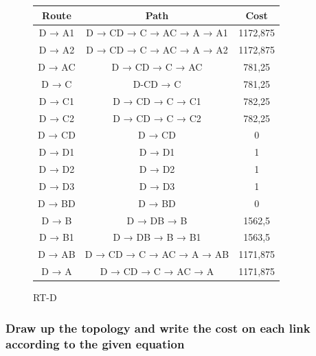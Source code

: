 \documentclass[a4paper, titlepage,12pt]{article}
\begin{document}
		\begin{figure}
			\begin{center}
				\begin{tabular}{|c|c|c|}
					\hline
	Route & Path & Cost \\
	\hline
	D → A1 & D → CD → C → AC → A → A1 & 1172,875 \\
	\hline
	D → A2 & D → CD → C → AC → A → A2 & 1172,875 \\
	\hline
	D → AC & D → CD → C → AC & 781,25 \\
	\hline
	D → C & D-CD → C & 781,25 \\
	\hline
	D → C1 & D → CD → C → C1 & 782,25 \\
	\hline
	D → C2 & D → CD → C → C2 & 782,25 \\
	\hline
	D → CD & D → CD & 0 \\
	\hline
	D → D1 & D → D1 & 1 \\
	\hline
	D → D2 & D → D2 & 1 \\
	\hline
	D → D3 & D → D3 & 1 \\
	\hline
	D → BD & D → BD & 0 \\
	\hline
	D → B & D → DB → B & 1562,5 \\
	\hline
	D → B1 & D → DB → B → B1 & 1563,5 \\
	\hline
	D → AB & D → CD → C → AC → A → AB & 1171,875 \\
	\hline
	D → A & D → CD → C → AC → A & 1171,875 \\
	\hline
				\end{tabular}
				\caption{RT-D}
			\end{center}
		\end{figure}

		\subsubsection{Draw up the topology and write the cost on each link according to the given equation}
\end{document}
